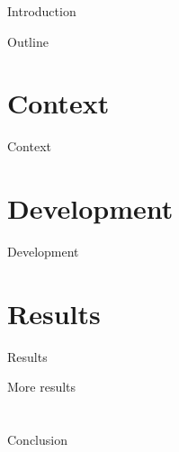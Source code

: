 \documentclass{beamer}
\makeatletter
\def\beamer@writeslidentry@miniframesoff{%
  \expandafter\beamer@ifempty\expandafter{\beamer@framestartpage}{}%
  {%
    \clearpage\beamer@notesactions%
  }
}
\newcommand*{\miniframesoff}{\let\beamer@writeslidentry=\beamer@writeslidentry@miniframesoff}
\makeatother
\begin{document}
    \begin{frame}
        \titlepage
    \end{frame}

    \begin{frame}{Introduction}
    \end{frame}

    \begin{frame}{Outline}
        \tableofcontents[pausesections]
    \end{frame}

    \section{Context}
    \begin{frame}{Context}
    \end{frame}

    \section{Development}
    \begin{frame}{Development}
    \end{frame}

    \section{Results}
    \begin{frame}{Results}
    \end{frame}
    \begin{frame}{More results}
    \end{frame}

        \miniframesoff
    \section{}
    \begin{frame}{Conclusion}
    \end{frame}
\end{document}
